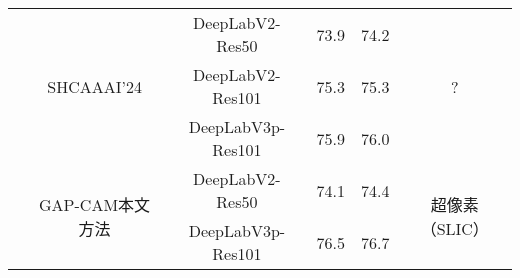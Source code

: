 \begin{table}[h]
\begin{tabular}{c|c|c|c|c|c}
\cline{2-6}
& \multirow{3}{*}{SHC\cite{zhang2024scribble}\tiny{AAAI'24}} & DeepLabV2-Res50   & 73.9 & 74.2 & \multirow{3}{*}{?} \\
\cline{3-5}
&                                                            & DeepLabV2-Res101  & 75.3 & 75.3 &                    \\
\cline{3-5}
&                                                            & DeepLabV3p-Res101 & 75.9 & 76.0 &                    \\
\cline{2-6}
& \multirow{2}{*}{GAP-CAM\tiny{本文方法}} & DeepLabV2-Res50   & 74.1 & 74.4 & \multirow{2}{*}{超像素（SLIC）} \\
\cline{3-5}
&                                        & DeepLabV3p-Res101 & 76.5 & 76.7 &                               \\
\bottomrule[1.5pt]
\end{tabular}
\end{table}

